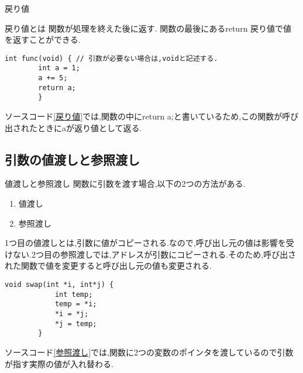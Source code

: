 \documentclass[xdvipdfmx, 8pt, t]{beamer}
\begin{document}
\begin{frame}[fragile]{戻り値}
\begin{block}{戻り値とは}
    関数が処理を終えた後に返す.
    関数の最後にあるreturn 戻り値で値を返すことができる.
\end{block}
    \begin{lstlisting}[caption=戻り値の例, label=戻り値]
        int func(void) { // 引数が必要ない場合は,voidと記述する.
        int a = 1;
        a += 5;
        return a;
        }
    \end{lstlisting}
    ソースコード\ref{戻り値}では,関数の中にreturn a;と書いているため,この関数が呼び出されたときにaが返り値として返る.
\end{frame}

\subsection{引数の値渡しと参照渡し}
\begin{frame}[fragile]{値渡しと参照渡し}
    関数に引数を渡す場合,以下の2つの方法がある.
    \begin{enumerate}
        \item 値渡し
        \item 参照渡し
    \end{enumerate}
    1つ目の値渡しとは,引数に値がコピーされる.なので,呼び出し元の値は影響を受けない.2つ目の参照渡しでは,アドレスが引数にコピーされる.そのため,呼び出された関数で値を変更すると呼び出し元の値も変更される.
    \begin{lstlisting}[caption=参照渡しの例, label=参照渡し]
        void swap(int *i, int*j) {
            int temp;
            temp = *i;
            *i = *j;
            *j = temp;
        }
    \end{lstlisting}
    ソースコード\ref{参照渡し}では,関数に2つの変数のポインタを渡しているので引数が指す実際の値が入れ替わる.
\end{frame}
\end{document}

